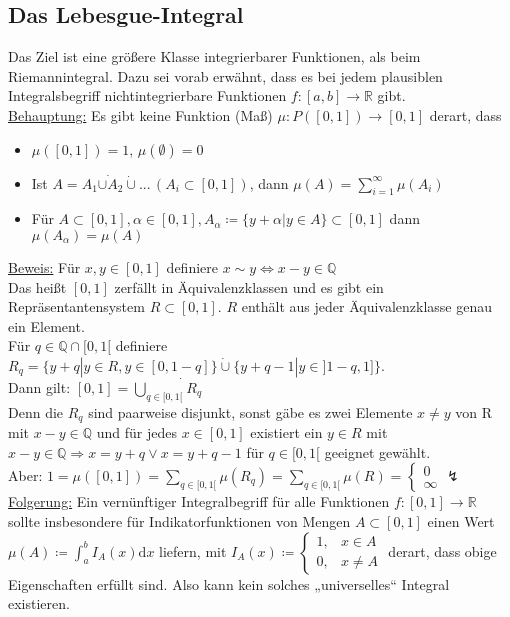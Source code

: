 \subsection{Das Lebesgue-Integral}

Das Ziel ist eine größere Klasse integrierbarer Funktionen, als beim Riemannintegral. Dazu sei vorab erwähnt, dass es bei jedem plausiblen Integralsbegriff nichtintegrierbare Funktionen $f\colon [a,b] \to \mathbb{R}$ gibt.\\
\underline{Behauptung:} Es gibt keine Funktion (Maß) $\mu\colon P([0,1]) \to [0,1]$ derart, dass
\begin{itemize}
	\item $\mu([0,1]) = 1, \, \mu(\emptyset) = 0$
	\item Ist $A = A_1 \dot{\cup A_2} \dot{\cup} ... \,(A_i \subset [0,1])$, dann $\mu(A) = \sum_{i=1}^{\infty} \mu(A_i)$
	\item Für $A \subset [0,1], \alpha \in [0,1], A_{\alpha} \coloneqq \{y + \alpha | y \in A\} \subset [0,1]$ dann $\mu(A_{\alpha}) = \mu(A)$
\end{itemize}
\underline{Beweis:} Für $x,y\in [0,1]$ definiere $x \sim y \Leftrightarrow x-y \in \mathbb{Q}$\\
Das heißt $[0,1]$ zerfällt in Äquivalenzklassen und es gibt ein Repräsentantensystem $R \subset [0,1]$. $R$ enthält aus jeder Äquivalenzklasse genau ein Element.\\
Für $q\in \mathbb{Q} \cap [0,1[$ definiere $R_q = \{y + q | y \in R, y \in [0,1-q]\} \dot{\cup} \{ y+q-1|y \in ]1-q,1] \}$.\\
Dann gilt: $[0,1] = \dot{\bigcup_{q\in[0,1[}} R_q$\\
Denn die $R_q$ sind paarweise disjunkt, sonst gäbe es zwei Elemente $x\neq y$ von R mit $x-y \in \mathbb{Q}$ und für jedes $x \in [0,1]$ existiert ein $y \in R$ mit $x-y \in \mathbb{Q} \Rightarrow x = y + q \lor x = y + q - 1$ für $q\in [0,1[$ geeignet gewählt.\\
Aber: $1 = \mu([0,1]) = \sum_{q \in [0,1[} \mu(R_q) = \sum_{q \in [0,1[} \mu(R) =
\left \{
\begin{matrix}
0\\
\infty
\end{matrix}
\right . \lightning$\\
\underline{Folgerung:} Ein vernünftiger Integralbegriff für alle Funktionen $f\colon [0,1] \to \mathbb{R}$ sollte insbesondere für Indikatorfunktionen von Mengen $A \subset [0,1]$ einen Wert $\mu(A)\coloneqq \int_{a}^{b} I_A(x) \text{d}x$ liefern, mit $I_A(x) \coloneqq \left \{ \begin{matrix}
1, & x \in A\\
0, & x \ne A
\end{matrix}
\right .$ derart, dass obige Eigenschaften erfüllt sind. Also kann kein solches „universelles“ Integral existieren.